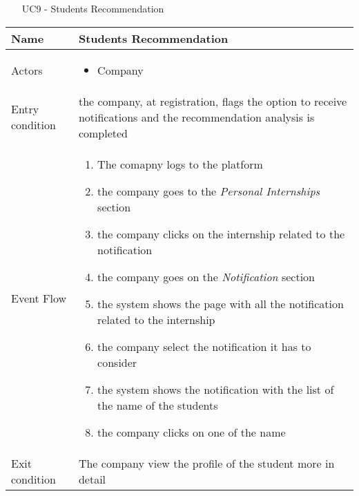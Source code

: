 				\begin{table} [H]
					\centering
					\begin{itemize}
						\item [UC9] - Students Recommendation
					\end{itemize}
					\begin{tabular}{|| P{7.5cm} | P{7.5cm} ||}
						\hline
						Name & Students Recommendation \\
						\hline
						Actors & \parbox{5cm}{\begin{itemize}
								\item Company
							\end{itemize}
						} \\
						\hline
						Entry condition & the company, at registration, flags the 
						option to receive notifications and the recommendation analysis is completed\\
						\hline
						Event Flow & \parbox{5cm}{\begin{enumerate}
								\item The comapny logs to the platform  
								\item the company goes to the \textit{Personal Internships} 
								section
								\item  the company clicks on the internship related to the notification
								\item the company goes on the \textit{Notification} section 
								\item the system shows the page with all the notification related to the internship
								\item the company select the notification it has to consider
								\item the system shows the notification with the list of the name of the students
								\item the company clicks on one of the name
						\end{enumerate}} \\
						\hline 
						Exit condition & The company view the profile of the student more in 
						detail \\
						\hline
					\end{tabular}
				\end{table}
				
				
			
